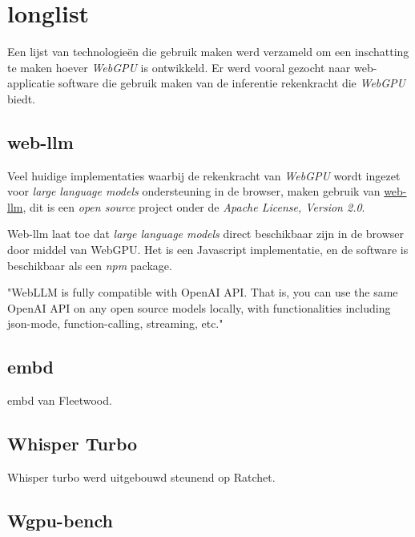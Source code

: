 \chapter{longlist}
\label{ch:longlist}

Een lijst van technologieën die gebruik maken werd verzameld om een inschatting te maken hoever \textit{WebGPU} is ontwikkeld. Er werd vooral gezocht naar web-applicatie software die gebruik maken van de inferentie rekenkracht die \textit{WebGPU} biedt.

\section{web-llm}

Veel huidige implementaties waarbij de rekenkracht van \textit{WebGPU} wordt ingezet voor \textit{large language models} ondersteuning in de browser, maken gebruik van \href{https://github.com/mlc-ai/web-llm}{web-llm}, dit is een \textit{open source} project onder de \textit{Apache License, Version 2.0}.

\bigbreak{}

Web-llm laat toe dat \textit{large language models} direct beschikbaar zijn in de browser door middel van WebGPU. Het is een Javascript implementatie, en de software is beschikbaar als een \textit{npm} package.

\begin{displayquote}
    "WebLLM is fully compatible with OpenAI API. That is, you can use the same OpenAI API on any open source models locally, with functionalities including json-mode, function-calling, streaming, etc."
\end{displayquote}

\section{embd}

embd van Fleetwood. \autocite{Fleetwood2023c}

\section{Whisper Turbo}

Whisper turbo werd uitgebouwd steunend op Ratchet. \autocite{Fleetwood2023b}

\section{Wgpu-bench}

